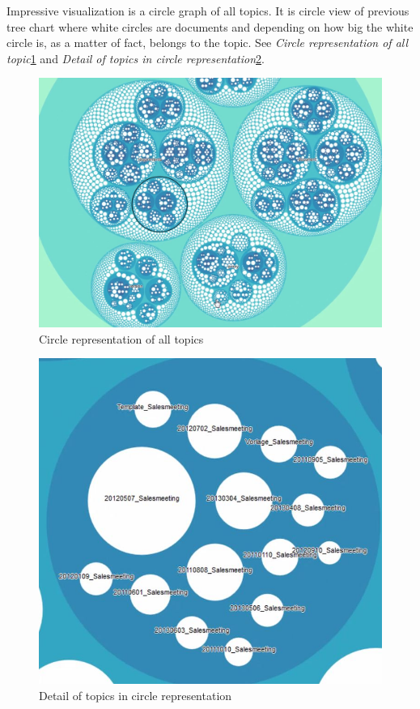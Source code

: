 \documentclass[thesis=M,english]{FITthesis}[2012/06/26]
\begin{document}
Impressive visualization is a circle graph of all topics. It is circle view of previous tree chart where white circles are documents and depending on how big the white circle is, as a matter of fact, belongs to the topic. See \textit{Circle representation of all topic}\ref{fig:lda_documents_cloud} and \textit{Detail of topics in circle representation}\ref{fig:lda_circle_detail}.

\begin{figure}[h!]\centering
	\includegraphics[width=1\textwidth]{pictures/lda_documents_cloud}
	\caption{Circle representation of all topics}\label{fig:lda_documents_cloud}
\end{figure}

\begin{figure}[p!]\centering
	\includegraphics[width=1\textwidth]{pictures/lda_circle_detail}
	\caption{Detail of topics in circle representation}\label{fig:lda_circle_detail}
\end{figure}
\end{document}
